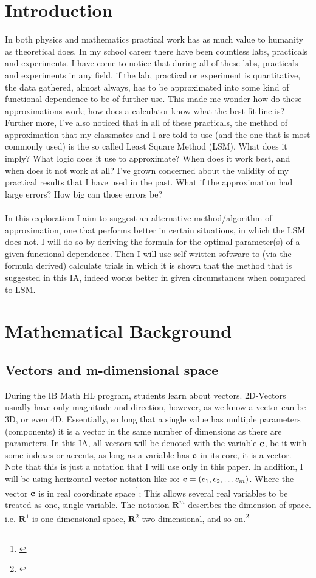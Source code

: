 \section{Introduction}
In both physics and mathematics practical work has as much value to humanity as theoretical does. In my school career there have been countless labs, practicals and experiments. I have come to notice that during all of these labs, practicals and experiments in any field, if the lab, practical or experiment is quantitative, the data gathered, almost always, has to be approximated into some kind of functional dependence to be of further use. This made me wonder how do these approximations work; how does a calculator know what the best fit line is? Further more, I've also noticed that in all of these practicals, the method of approximation that my classmates and I  are told to use (and the one that is most commonly used) is the so called Least Square Method (LSM). What does it imply? What logic does it use to approximate? When does it work best, and when does it not work at all? I've grown concerned about the validity of my practical results that I have used in the past. What if the approximation had large errors? How big can those errors be? \\
\\
In this exploration I aim to suggest an alternative method/algorithm of approximation, one that performs better in certain situations, in which the LSM does not. I will do so by deriving the formula for the optimal parameter(s) of a given functional dependence. Then I will use self-written software to (via the formula derived) calculate trials in which it is shown that the method that is suggested in this IA, indeed works better in given circumstances when compared to LSM. 
\section{Mathematical Background} \label{concepts}
\subsection{Vectors and m-dimensional space}

During the IB Math HL program, students learn about vectors. 2D-Vectors usually have only magnitude and direction, however, as we know a vector can be 3D, or even 4D. Essentially, so long that a single value has multiple parameters (components) it is a vector in the same number of dimensions as there are parameters. In this IA, all vectors will be denoted with the variable $\textbf{c}$, be it with some indexes or accents, as long as a variable has $\textbf{c}$ in its core, it is a vector. Note that this is just a notation that I will use only in this paper. In addition, I will be using herizontal vector notation like so: $\textbf{c}=(c_{1},c_{2},\dots c_{m})$. Where the vector ${\textbf{c}}$ is in real coordinate space\footnote{\cite{kelley_1995}}; This allows several real variables to be treated as one, single variable. The notation $\boldsymbol{R}^{m}$ describes the dimension of space. i.e. $\boldsymbol{R}^{1}$ is one-dimensional space, $\boldsymbol{R}^{2}$ two-dimensional, and so on.\footnote{\cite{Weisstein_2014}}
